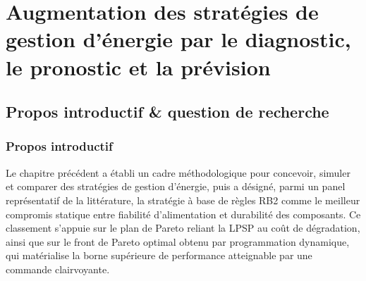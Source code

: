 \chapter{Augmentation des stratégies de gestion d'énergie par le diagnostic, le pronostic et la prévision}
\pagestyle{fancy}
\fancyhead[LE]{\textbf{\thepage}}
\fancyhead[RO]{\textbf{\thepage}}
\fancyhead[LO]{\textbf{\leftmark}}
\renewcommand{\sectionmark}[1]{\markboth{#1}{}}
\fancyfoot{}

\newcommand{\RBsohH}{RB2(SoH$_{\mathrm{H_2}}$)}
\newcommand{\RBsohB}{RB2(SoH$_{\mathrm{bat}}$)}
\newcommand{\RBsohA}{RB2(SoH$_{\mathrm{all}}$)}
\newcommand{\RBshp}{RB2(SoH$_{\mathrm{H_2}}$+Pred)}
\newcommand{\RBult}{RB2(SoH$_{\mathrm{all}}$+Pred)}


\section{Propos introductif \& question de recherche}

\subsection{Propos introductif}

Le chapitre précédent a établi un cadre méthodologique pour concevoir, simuler et comparer des stratégies de gestion d'énergie, puis a désigné, parmi un panel représentatif de la littérature, la stratégie à base de règles RB2 comme le meilleur compromis statique entre fiabilité d'alimentation et durabilité des composants. Ce classement s'appuie sur le plan de Pareto reliant la LPSP au coût de dégradation, ainsi que sur le front de Pareto optimal obtenu par programmation dynamique, qui matérialise la borne supérieure de performance atteignable par une commande clairvoyante.


